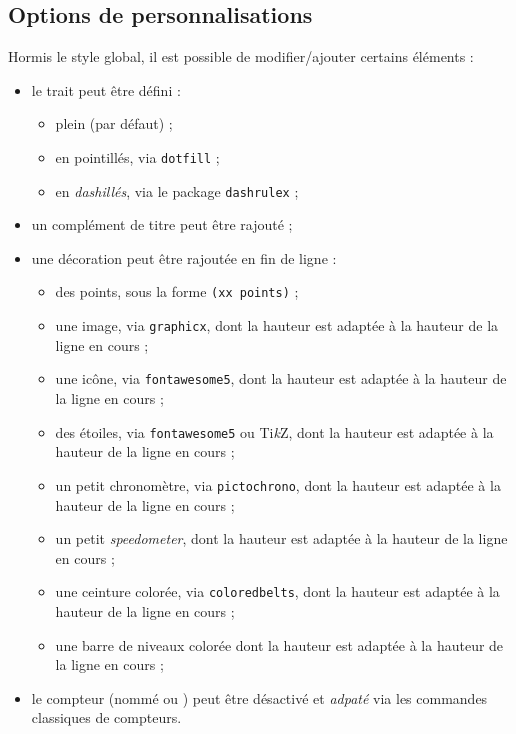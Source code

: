 \documentclass[french,11pt,a4paper]{article}
\providecommand\tikzlogo{Ti\textit{k}Z}
\let\TikZ\tikzlogo
\begin{document}
\subsection{Options de personnalisations}

Hormis le style global, il est possible de modifier/ajouter certains éléments :

\begin{itemize}
	\item le trait peut être défini :
	\begin{itemize}
		\item plein (par défaut) ;
		\item en pointillés, via \texttt{dotfill} ;
		\item en \textit{dashillés}, via le package \texttt{dashrulex} ;
	\end{itemize}
	\item un complément de titre peut être rajouté ;
	\item une décoration peut être rajoutée en fin de ligne :
	\begin{itemize}
		\item des points, sous la forme \texttt{(xx points)} ;
		\item une image, via \texttt{graphicx}, dont la hauteur est adaptée à la hauteur de la ligne en cours ;
		\item une icône, via \texttt{fontawesome5}, dont la hauteur est adaptée à la hauteur de la ligne en cours ;
		\item des étoiles, via \texttt{fontawesome5} ou \TikZ, dont la hauteur est adaptée à la hauteur de la ligne en cours ;
		\item un petit chronomètre, via \texttt{pictochrono}, dont la hauteur est adaptée à la hauteur de la ligne en cours ;
		\item un petit \textit{speedometer}, dont la hauteur est adaptée à la hauteur de la ligne en cours ;
		\item une ceinture colorée, via \texttt{coloredbelts}, dont la hauteur est adaptée à la hauteur de la ligne en cours ;
		\item une barre de niveaux colorée dont la hauteur est adaptée à la hauteur de la ligne en cours ;
	\end{itemize}
	\item le compteur (nommé  ou ) peut être désactivé et \textit{adpaté} via les commandes classiques de compteurs.
\end{itemize}
\end{document}
